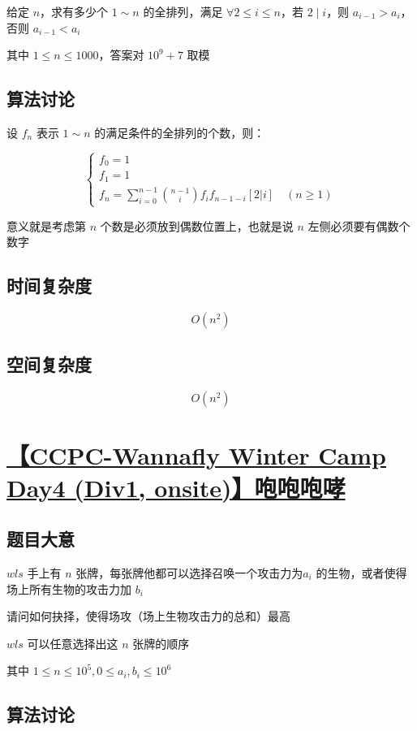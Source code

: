 \documentclass[UTF8]{article}
\begin{document}
给定 $n$，求有多少个 $1 \sim n$ 的全排列，满足 $\forall 2 \le i \le n$，若 $2 \mid i$，则 $a_{i-1} > a_i$，否则 $a_{i-1} < a_i$

其中 $1 \le n \le 1000$，答案对 $10^9+7$ 取模

\subsection{算法讨论}

设 $f_n$ 表示 $1 \sim n$ 的满足条件的全排列的个数，则：

$$
\begin{cases}
f_0=1 \\
f_1=1 \\
f_n=\sum_{i=0}^{n-1} {n - 1 \choose i} f_i f_{n-1-i} [2 | i] \quad (n \ge 1)
\end{cases}
$$

意义就是考虑第 $n$ 个数是必须放到偶数位置上，也就是说 $n$ 左侧必须要有偶数个数字

\subsection{时间复杂度}

$$
O(n^2)
$$

\subsection{空间复杂度}

$$
O(n^2)
$$

\section{\href{https://www.zhixincode.com/contest/16/problem/I?problem_id=245}{【CCPC-Wannafly Winter Camp Day4 (Div1, onsite)】咆咆咆哮}}

\subsection{题目大意}

$wls$ 手上有 $n$ 张牌，每张牌他都可以选择召唤一个攻击力为$a_i$ 的生物，或者使得场上所有生物的攻击力加 $b_i$ 

请问如何抉择，使得场攻（场上生物攻击力的总和）最高

$wls$ 可以任意选择出这 $n$ 张牌的顺序

其中 $1 \le n \le 10^5,0 \le a_i,b_i \le 10^6$

\subsection{算法讨论}
\end{document}
